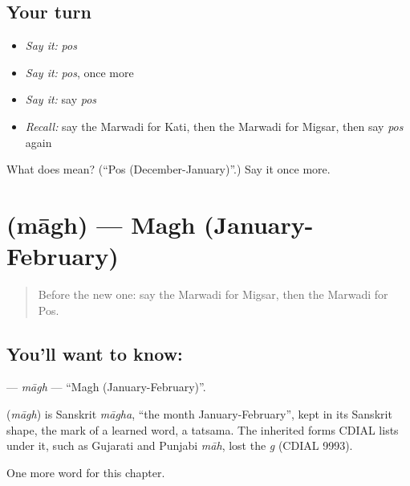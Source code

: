 \subsection*{Your turn}
\begin{itemize}
\raggedright
  \item \emph{Say it:} \emph{pos}
  \item \emph{Say it:} \emph{pos}, once more
  \item \emph{Say it:} say \emph{pos}
  \item \emph{Recall:} say the Marwadi for Kati, then the Marwadi for Migsar, then say \emph{pos} again
\end{itemize}

\begin{tcolorbox}[breakable,colback=teal!4,colframe=teal!35!black,title={Before you move on}]
What does  mean? (\textquotedblleft{}Pos (December-January)\textquotedblright{}.) Say it once more.
\end{tcolorbox}
\section[\texorpdfstring{\mw{माघ} (māgh)}{माघ (māgh)}]{ (māgh) — Magh (January-February)}

\label{lesson:MW-C94-magh}



\begin{quote}
Before the new one: say the Marwadi for Migsar, then the Marwadi for Pos.
\end{quote}

\subsection*{You'll want to know: }
\textbf{} — \emph{māgh} — \textquotedblleft{}Magh (January-February)\textquotedblright{}.

\begin{cousinweb}
\textbf{} (\emph{māgh}) is Sanskrit \emph{māgha}, \textquotedblleft{}the month January-February\textquotedblright{}, kept in its Sanskrit shape, the mark of a learned word, a tatsama. The inherited forms CDIAL lists under it, such as Gujarati and Punjabi \emph{māh}, lost the \emph{g} (CDIAL 9993).
\end{cousinweb}

\begin{grammarlens}[title={What you've built}]
One more word for this chapter.
\end{grammarlens}

